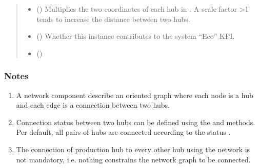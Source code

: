 \documentclass[letterpaper,10pt,english]{sphinxmanual}
\begin{document}
\begin{fulllineitems}
\begin{fulllineitems}
\begin{quote}
\begin{description}
\begin{itemize}
\item {} 
\sphinxAtStartPar
{} (\sphinxstyleliteralemphasis{\sphinxupquote{, }}\sphinxstyleliteralemphasis{\sphinxupquote{, }}) \textendash{} Multiplies the two coordinates of each hub in .
A scale factor \textgreater{}1 tends to increase the distance between two hubs.

\item {} 
\sphinxAtStartPar
{} (\sphinxstyleliteralemphasis{\sphinxupquote{, }}\sphinxstyleliteralemphasis{\sphinxupquote{, }}) \textendash{} Whether this instance contributes to the system “Eco” KPI.

\item {} 
\sphinxAtStartPar
{} (\sphinxstyleliteralemphasis{\sphinxupquote{, }}) \textendash{} 

\end{itemize}

\end{description}\end{quote}
\subsubsection*{Notes}
\begin{enumerate}
%
\item {} 
\sphinxAtStartPar
A network component describe an oriented graph where each node is a hub and each edge is a connection between two hubs.

\item {} 
\sphinxAtStartPar
Connection status between two hubs can be defined using the  and  methods.
Per default, all pairs of hubs are connected according to the status .

\item {} 
\sphinxAtStartPar
The connection of production hub to every other hub using the network is not mandatory,
i.e. nothing constrains the network graph to be connected.


\end{enumerate}
\end{fulllineitems}
\end{fulllineitems}
\end{document}
